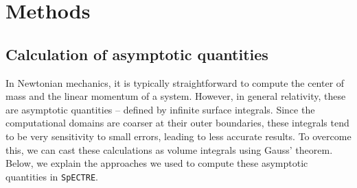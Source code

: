 \documentclass{../document}
\begin{document}
  \section{Methods}

    \subsection{Calculation of asymptotic quantities}

      In Newtonian mechanics, it is typically straightforward to compute the center of mass and the linear momentum of a system. However, in general relativity, these are asymptotic quantities -- defined by infinite surface integrals. Since the computational domains are coarser at their outer boundaries, these integrals tend to be very sensitivity to small errors, leading to less accurate results. To overcome this, we can cast these calculations as volume integrals using Gauss' theorem. Below, we explain the approaches we used to compute these asymptotic quantities in {\tt SpECTRE}.
\end{document}
